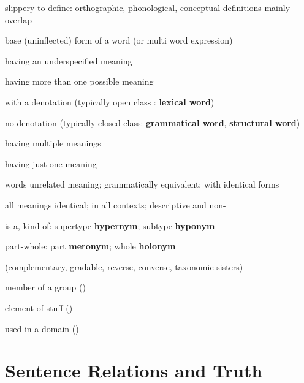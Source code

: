 \documentclass[headrule,footrule]{foils}
\begin{document}
\begin{description}
\item {} slippery to define: orthographic, phonological, conceptual definitions mainly overlap
\item {} base (uninflected) form of a word (or multi word expression)
\item {} having an underspecified meaning
\item {} having more than one possible meaning
\item {} with a denotation (typically open class : \textbf{lexical word})
\item {} no denotation (typically closed class:
  \textbf{grammatical word}, \textbf{structural word})
\end{description}


\begin{description}
\item {} having multiple meanings
\item {} having just one meaning
\item {} words unrelated meaning; grammatically equivalent;
  with identical forms
\end{description} 


\begin{description}
\item {}  all meanings identical; in all contexts; descriptive and non-
\item {} is-a, kind-of: supertype \textbf{hypernym}; subtype \textbf{hyponym}
\item {} part-whole: part \textbf{meronym}; whole \textbf{holonym}
\item {} (complementary, gradable, reverse, converse, taxonomic sisters)
\item {} member of a group ()
\item {} element of stuff ()
\item {}  used in a domain ()
\end{description}

\section{Sentence Relations and Truth}
\newpage
\end{document}
